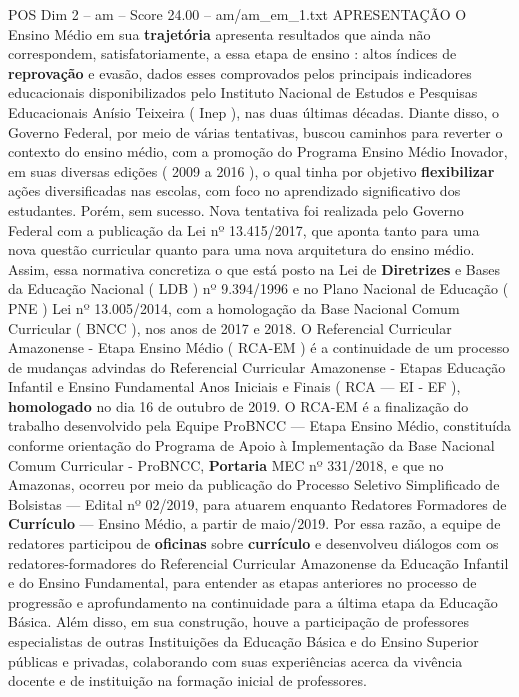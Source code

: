 \begin{textsample}{POS Dim 2 – am – Score 24.00 – am/am\_em\_1.txt}  \label{ex:f2_pos_153}
APRESENTAÇÃO O Ensino Médio em sua \textbf{trajetória} apresenta resultados que ainda não correspondem, satisfatoriamente, a essa etapa de ensino : altos índices de \textbf{reprovação} e evasão, dados esses comprovados pelos principais indicadores educacionais disponibilizados pelo Instituto Nacional de Estudos e Pesquisas Educacionais Anísio Teixeira ( Inep ), nas duas últimas décadas.
Diante disso, o Governo Federal, por meio de várias tentativas, buscou caminhos para reverter o contexto do ensino médio, com a promoção do Programa Ensino Médio Inovador, em suas diversas edições ( 2009 a 2016 ), o qual tinha por objetivo \textbf{flexibilizar} ações diversificadas nas escolas, com foco no aprendizado significativo dos estudantes.
Porém, sem sucesso.
Nova tentativa foi realizada pelo Governo Federal com a publicação da Lei nº 13.415/2017, que aponta tanto para uma nova questão curricular quanto para uma nova arquitetura do ensino médio.
Assim, essa normativa concretiza o que está posto na Lei de \textbf{Diretrizes} e Bases da Educação Nacional ( LDB ) nº 9.394/1996 e no Plano Nacional de Educação ( PNE ) Lei nº 13.005/2014, com a homologação da Base Nacional Comum Curricular ( BNCC ), nos anos de 2017 e 2018.
O Referencial Curricular Amazonense - Etapa Ensino Médio ( RCA-EM ) é a continuidade de um processo de mudanças advindas do Referencial Curricular Amazonense - Etapas Educação Infantil e Ensino Fundamental Anos Iniciais e Finais ( RCA — EI - EF ), \textbf{homologado} no dia 16 de outubro de 2019.
O RCA-EM é a finalização do trabalho desenvolvido pela Equipe ProBNCC — Etapa Ensino Médio, constituída conforme orientação do Programa de Apoio à Implementação da Base Nacional Comum Curricular - ProBNCC, \textbf{Portaria} MEC nº 331/2018, e que no Amazonas, ocorreu por meio da publicação do Processo Seletivo Simplificado de Bolsistas — Edital nº 02/2019, para atuarem enquanto Redatores Formadores de \textbf{Currículo} — Ensino Médio, a partir de maio/2019.
Por essa razão, a equipe de redatores participou de \textbf{oficinas} sobre \textbf{currículo} e desenvolveu diálogos com os redatores-formadores do Referencial Curricular Amazonense da Educação Infantil e do Ensino Fundamental, para entender as etapas anteriores no processo de progressão e aprofundamento na continuidade para a última etapa da Educação Básica.
Além disso, em sua construção, houve a participação de professores especialistas de outras Instituições da Educação Básica e do Ensino Superior públicas e privadas, colaborando com suas experiências acerca da vivência docente e de instituição na formação inicial de professores.

\end{textsample}
